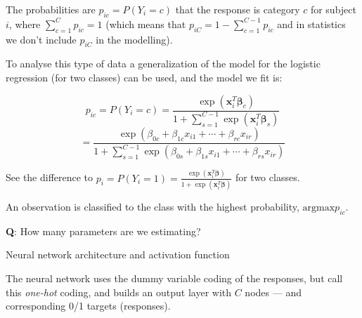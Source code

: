 \documentclass[10pt,ignorenonframetext,]{beamer}
\begin{document}
\begin{frame}

The probabilities are \(p_{ic}=P(Y_i=c)\) that the response is category
\(c\) for subject \(i\), where \(\sum_{c=1}^C p_{ic}=1\) (which means
that \(p_{iC}=1-\sum_{c=1}^{C-1} p_{ic}\) and in statistics we don't
include \(p_{iC}\) in the modelling).

To analyse this type of data a generalization of the model for the
logistic regression (for two classes) can be used, and the model we fit
is:

\[p_{ic}=P(Y_i=c)= \frac{\exp({\boldsymbol x}_i^T{\boldsymbol \beta}_c)}{1+\sum_{s=1}^{C-1}\exp({\boldsymbol x}_i^T{\boldsymbol \beta}_s)}\]
\[=
\frac{\exp(\beta_{0c}+\beta_{1c} x_{i1}+\cdots + \beta_{rc} x_{ir})}{1 + \sum_{s=1}^{C-1} \exp(\beta_{0s} + \beta_{1s} x_{i1}+\cdots+\beta_{rs} x_{ir})}\]

See the difference to
\(p_i=P(Y_i=1)= \frac{\exp({\boldsymbol x}_i^T{\boldsymbol \beta})}{1+\exp({\boldsymbol x}_i^T{\boldsymbol \beta})}\)
for two classes.

An observation is classified to the class with the highest probability,
\(\text{argmax}p_{ic}\).

\textbf{Q}: How many parameters are we estimating?

\end{frame}

\begin{frame}

\begin{block}{Neural network architecture and activation function}

The neural network uses the dummy variable coding of the responses, but
call this \emph{one-hot} coding, and builds an output layer with \(C\)
nodes --- and corresponding 0/1 targets (responses).

\end{block}

\end{frame}
\end{document}
